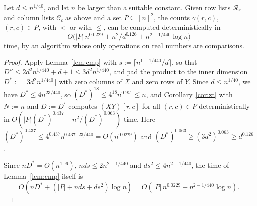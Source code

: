 \begin{corollary}\label{cor:cmp}
Let $d\le n^{1/40}$, and let $n$ be larger than a suitable constant. Given row lists $\mathcal R_r$ and column lists $\mathcal C_c$ as above and a set $P\subseteq[n]^2$, the counts $\gamma(r,c)$, $(r,c)\in P$, with $<$ or with $\le$, can be computed deterministically in
\[
O\big(|P|\,n^{0.0229}+n^2/d^{0.126}+n^{2-1/440}\log n\big)
\]
time, by an algorithm whose only operations on real numbers are comparisons.
\end{corollary}
\begin{proof}
Apply Lemma~\ref{lem:cmp} with $s:=\lceil n^{1-1/440}/d\rceil$, so that $D''\le2d^2n^{1/440}+d+1\le3d^2n^{1/440}$, and pad the product to the inner dimension $D^*:=\lceil3d^2n^{1/440}\rceil$ with zero columns of $X$ and zero rows of $Y$. 
Since $d\le n^{1/40}$, we have $D^*\le4n^{23/440}$, so $(D^*)^{18}\le4^{18}n^{0.941}\le n$, and Corollary~\ref{cor:zt} with $N:=n$ and $D:=D^*$ computes $(XY)[r,c]$ for all $(r,c)\in P$ deterministically in $O(|P|(D^*)^{0.437}+n^2/(D^*)^{0.063})$ time. Here $(D^*)^{0.437}\le4^{0.437}n^{0.437\cdot23/440}=O(n^{0.0229})$ and $(D^*)^{0.063}\ge(3d^2)^{0.063}\ge d^{0.126}$. 

Since $nD^*=O(n^{1.06})$, $nds\le2n^{2-1/440}$ and $ds^2\le4n^{2-1/440}$, the time of Lemma~\ref{lem:cmp} itself is $$O(nD^*+(|P|+nds+ds^2)\log n)=O(|P|\,n^{0.0229}+n^{2-1/440}\log n).$$
\end{proof}

